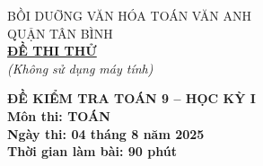 \documentclass[12pt]{article}
\begin{document}
\begin{center}
    \begin{minipage}[t]{0.45\textwidth}
        \centering
        BỒI DUỠNG VĂN HÓA TOÁN VĂN ANH \\
        QUẬN TÂN BÌNH \\
        \textbf{\underline{ĐỀ THI THỬ}} \\
        \textit{(Không sử dụng máy tính)}
    \end{minipage}
    \hspace{0.08\textwidth}
    \begin{minipage}[t]{0.45\textwidth}
        \centering
        \textbf{ĐỀ KIỂM TRA TOÁN 9 – HỌC KỲ I}\\
        \textbf{Môn thi: TOÁN} \\
        \textbf{Ngày thi: 04 tháng 8 năm 2025} \\
        \textbf{Thời gian làm bài: 90 phút} \\
    \end{minipage}
\end{center}
\bigskip
\end{document}
